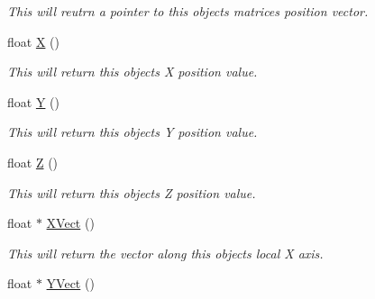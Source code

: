\begin{DoxyCompactItemize}
\begin{DoxyCompactList}\small\item\em This will reutrn a pointer to this objects matrices position vector. \end{DoxyCompactList}\item 
\hypertarget{classc_matrix4_aff5d7d1cf3cf0b9ddb9e55e2f799012f}{
float \hyperlink{classc_matrix4_aff5d7d1cf3cf0b9ddb9e55e2f799012f}{X} ()}
\label{classc_matrix4_aff5d7d1cf3cf0b9ddb9e55e2f799012f}

\begin{DoxyCompactList}\small\item\em This will return this objects X position value. \end{DoxyCompactList}\item 
\hypertarget{classc_matrix4_aa22f36646d19566a438a297cb9a9bfb5}{
float \hyperlink{classc_matrix4_aa22f36646d19566a438a297cb9a9bfb5}{Y} ()}
\label{classc_matrix4_aa22f36646d19566a438a297cb9a9bfb5}

\begin{DoxyCompactList}\small\item\em This will return this objects Y position value. \end{DoxyCompactList}\item 
\hypertarget{classc_matrix4_a8b62f500f8194b06dab12e85e57fd9ef}{
float \hyperlink{classc_matrix4_a8b62f500f8194b06dab12e85e57fd9ef}{Z} ()}
\label{classc_matrix4_a8b62f500f8194b06dab12e85e57fd9ef}

\begin{DoxyCompactList}\small\item\em This will return this objects Z position value. \end{DoxyCompactList}\item 
\hypertarget{classc_matrix4_a958689f28a118eac91104f5a847ac0fd}{
float $\ast$ \hyperlink{classc_matrix4_a958689f28a118eac91104f5a847ac0fd}{XVect} ()}
\label{classc_matrix4_a958689f28a118eac91104f5a847ac0fd}

\begin{DoxyCompactList}\small\item\em This will return the vector along this objects local X axis. \end{DoxyCompactList}\item 
\hypertarget{classc_matrix4_acff0242ac76b2ccd854eeec0d4913abe}{
float $\ast$ \hyperlink{classc_matrix4_acff0242ac76b2ccd854eeec0d4913abe}{YVect} ()}
\label{classc_matrix4_acff0242ac76b2ccd854eeec0d4913abe}


\end{DoxyCompactItemize}
